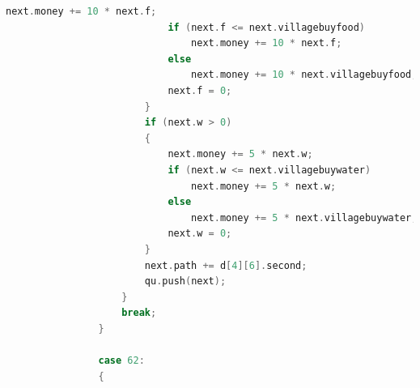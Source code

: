 \documentclass[withoutpreface,bwprint]{cumcmthesis} %
\begin{document}
\begin{appendices}
\begin{lstlisting}[language=c++]
                            next.money += 10 * next.f;
                            if (next.f <= next.villagebuyfood)
                                next.money += 10 * next.f;
                            else
                                next.money += 10 * next.villagebuyfood;
                            next.f = 0;
                        }
                        if (next.w > 0)
                        {
                            next.money += 5 * next.w;
                            if (next.w <= next.villagebuywater)
                                next.money += 5 * next.w;
                            else
                                next.money += 5 * next.villagebuywater;
                            next.w = 0;
                        }
                        next.path += d[4][6].second;
                        qu.push(next);
                    }
                    break;
                }
    
                case 62:
                {
                    

\end{lstlisting}
\end{appendices}
\end{document}
